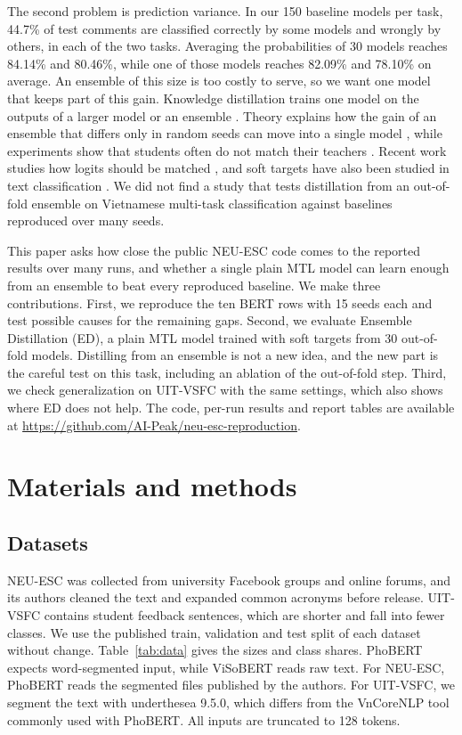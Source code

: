 \documentclass[pdflatex,sn-mathphys-num]{sn-jnl}%
\theoremstyle{thmstyleone}%
\theoremstyle{thmstyletwo}%
\theoremstyle{thmstylethree}%
\begin{document}
The second problem is prediction variance. In our 150 baseline models per task, 44.7\% of test comments are classified correctly by some models and wrongly by others, in each of the two tasks. Averaging the probabilities of 30 models reaches 84.14\% and 80.46\%, while one of those models reaches 82.09\% and 78.10\% on average. An ensemble of this size is too costly to serve, so we want one model that keeps part of this gain. Knowledge distillation trains one model on the outputs of a larger model or an ensemble \cite{bucilua2006compression,hinton2015distilling,moslemi2024survey}. Theory explains how the gain of an ensemble that differs only in random seeds can move into a single model \cite{allenzhu2023understanding}, while experiments show that students often do not match their teachers \cite{stanton2021distillation}. Recent work studies how logits should be matched \cite{sun2024logit}, and soft targets have also been studied in text classification \cite{ren2024smoothing}. We did not find a study that tests distillation from an out-of-fold ensemble on Vietnamese multi-task classification against baselines reproduced over many seeds.

This paper asks how close the public NEU-ESC code comes to the reported results over many runs, and whether a single plain MTL model can learn enough from an ensemble to beat every reproduced baseline. We make three contributions. First, we reproduce the ten BERT rows with 15 seeds each and test possible causes for the remaining gaps. Second, we evaluate Ensemble Distillation (ED), a plain MTL model trained with soft targets from 30 out-of-fold models. Distilling from an ensemble is not a new idea, and the new part is the careful test on this task, including an ablation of the out-of-fold step. Third, we check generalization on UIT-VSFC with the same settings, which also shows where ED does not help. The code, per-run results and report tables are available at \url{https://github.com/AI-Peak/neu-esc-reproduction}.

\section{Materials and methods}\label{sec:methods}

\subsection{Datasets}\label{subsec:data}

NEU-ESC was collected from university Facebook groups and online forums, and its authors cleaned the text and expanded common acronyms before release. UIT-VSFC contains student feedback sentences, which are shorter and fall into fewer classes. We use the published train, validation and test split of each dataset without change. Table~\ref{tab:data} gives the sizes and class shares. PhoBERT expects word-segmented input, while ViSoBERT reads raw text. For NEU-ESC, PhoBERT reads the segmented files published by the authors. For UIT-VSFC, we segment the text with underthesea 9.5.0, which differs from the VnCoreNLP tool commonly used with PhoBERT. All inputs are truncated to 128 tokens.
\end{document}
